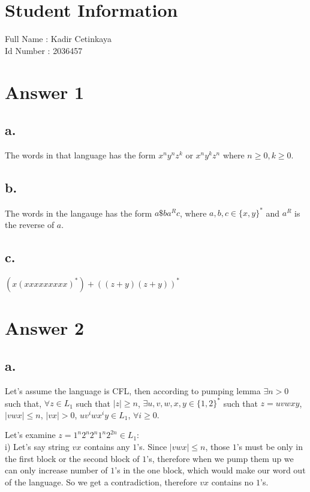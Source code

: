 \documentclass[12pt]{article}
\begin{document}
\section*{Student Information } 
Full Name : Kadir Cetinkaya \\
Id Number : 2036457 \\

\section*{Answer 1}

\subsection*{a.}
The words in that language has the form $x^ny^nz^k$ or $x^ny^kz^n$ where $n\ge 0, k\ge 0$.

\subsection*{b.}
The words in the langauge has the form $a\$ba^Rc$, where $a,b,c\in \{x,y\}^*$ and 
$a^R$ is the reverse of $a$.

\subsection*{c.}
$(x(xxxxxxxxx)^*)+((z+y)(z+y))^*$



\section*{Answer 2}

\subsection*{a.}
Let's assume the language is CFL, then according to pumping lemma $\exists n>0$ such that,
$\forall z\in L_1$ such that $|z|\ge n$, $\exists u,v,w,x,y\in \{1,2\}^*$ such that $z=uvwxy$,
$|vwx|\le n$, $|vx|>0$, $uv^iwx^iy\in L_1$, $\forall i\ge 0$.

Let's examine $z=1^n2^n2^n1^n2^{2n}\in L_1$:\\

i) Let's say string $vx$ contains any $1$'s. Since $|vwx|\le n$, those $1$'s must be only in the
first block or the second block of $1$'s, therefore when we pump them up we can only increase
number of $1$'s in the one block, which would make our word out of the language. So we get a
contradiction, therefore $vx$ contains no $1$'s.
\end{document}
